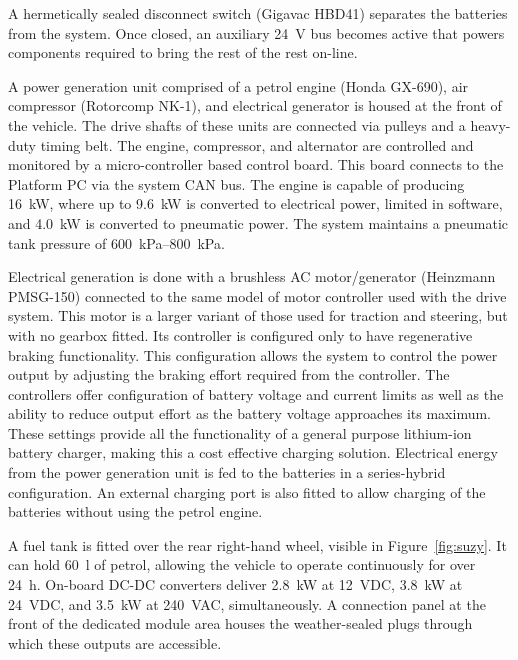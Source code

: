 \documentclass[preprint,authoryear,12pt]{elsarticle}
\begin{document}
        A hermetically sealed disconnect switch (Gigavac HBD41) separates the batteries from the system.
        Once closed, an auxiliary \SI{24}{\volt} bus becomes active that powers components required to bring the rest of the rest on-line.

        A power generation unit comprised of a petrol engine (Honda GX-690), air compressor (Rotorcomp NK-1), and electrical generator is housed at the front of the vehicle.
        The drive shafts of these units are connected via pulleys and a heavy-duty timing belt.
        The engine, compressor, and alternator are controlled and monitored by a micro-controller based control board.
        This board connects to the Platform PC via the system CAN bus.
        The engine is capable of producing \SI{16}{\kilo\watt}, where up to \SI{9.6}{\kilo\watt} is converted to electrical power, limited in software, and \SI{4.0}{\kilo\watt} is converted to pneumatic power.
        The system maintains a pneumatic tank pressure of \SIrange{600}{800}{\kilo\pascal}.

        Electrical generation is done with a brushless AC motor/generator (Heinzmann PMSG-150) connected to the same model of motor controller used with the drive system.
        This motor is a larger variant of those used for traction and steering, but with no gearbox fitted.
        Its controller is configured only to have regenerative braking functionality.
        This configuration allows the system to control the power output by adjusting the braking effort required from the controller.
        The controllers offer configuration of battery voltage and current limits as well as the ability to reduce output effort as the battery voltage approaches its maximum.
        These settings provide all the functionality of a general purpose lithium-ion battery charger, making this a cost effective charging solution.
        Electrical energy from the power generation unit is fed to the batteries in a series-hybrid configuration.
        An external charging port is also fitted to allow charging of the batteries without using the petrol engine.

        A fuel tank is fitted over the rear right-hand wheel, visible in Figure~\ref{fig:suzy}.
        It can hold \SI{60}{\litre} of petrol, allowing the vehicle to operate continuously for over \SI{24}{\hour}.
        On-board DC-DC converters deliver \SI{2.8}{\kilo\watt} at \SI{12}{\volt}DC, \SI{3.8}{\kilo\watt} at \SI{24}{\volt}DC, and \SI{3.5}{\kilo\watt} at \SI{240}{\volt}AC, simultaneously.
        A connection panel at the front of the dedicated module area houses the weather-sealed plugs through which these outputs are accessible.
\end{document}
